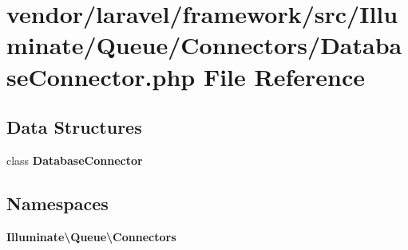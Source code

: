 \section{vendor/laravel/framework/src/\+Illuminate/\+Queue/\+Connectors/\+Database\+Connector.php File Reference}
\label{_database_connector_8php}
\subsection*{Data Structures}
\begin{DoxyCompactItemize}
\item 
class {\bf Database\+Connector}
\end{DoxyCompactItemize}
\subsection*{Namespaces}
\begin{DoxyCompactItemize}
\item 
 {\bf Illuminate\textbackslash{}\+Queue\textbackslash{}\+Connectors}
\end{DoxyCompactItemize}
